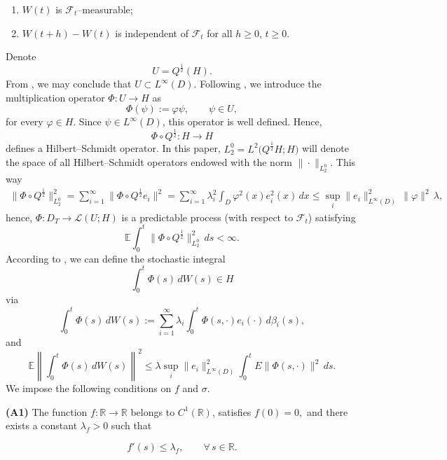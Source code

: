 \documentclass[a4paper,12pt]{article}
\numberwithin{equation}{section}
\def\E{\mathbb{E}}
\begin{document}
\begin{enumerate}
\item[(i)]
$W(t)$ is $\mathcal{F}_t$--measurable;

\item[(ii)]
$W(t+h)-W(t)$ is independent of $\mathcal{F}_t$ for all
$h\ge 0$, $t\ge 0$.
\end{enumerate}
Denote
\[
U=Q^{\frac12}(H).
\]
From \cite[Lemma 2.2]{18}, we may conclude that 
$U\subset L^\infty(D)$. Following \cite{18}, we introduce the multiplication
operator
$\Phi:U\to H$ as
\[
\Phi(\psi):=\varphi\psi,
\qquad
\psi\in U,
\]
for every $\varphi\in H$. Since $\psi\in L^\infty(D)$, this operator is
well defined. Hence,
\[
\Phi\circ Q^{\frac12}:H\to H
\]
defines a Hilbert--Schmidt operator. In this paper, $L_2^0 = L^2\!\bigl(Q^{\frac12}H;H\bigr)$
will denote the space of all Hilbert--Schmidt operators endowed with
the norm $\|\cdot\|_{L_2^0}$.
This way
\begin{equation}
\label{2.1}
\begin{aligned}
\|\Phi\circ Q^{\frac12}\|_{L_2^0}^{2}
=
\sum_{i=1}^{\infty}
\bigl\|
\Phi\circ Q^{\frac12}e_i
\bigr\|^{2} =
\sum_{i=1}^{\infty}
\lambda_i^{2}
\int_D
\varphi^{2}(x)e_i^{2}(x)\,dx
\le
\sup_i
\|e_i\|_{L^\infty(D)}^{2}
\,
\|\varphi\|^{2}
\,
\lambda,
\end{aligned}
\end{equation}
hence, $
\Phi:D_T\to\mathcal{L}(U;H)
$ is a predictable process (with respect to $\mathcal{F}_t$)
satisfying
\[
\E\int_0^t
\|\Phi\circ Q^{\frac12}\|_{L_2^0}^{2}
\,ds
<
\infty .
\]
According to \cite{19}, we can define the stochastic integral
\[
\int_0^t \Phi(s)\,dW(s)\in H
\]
via
\[
\int_0^t \Phi(s)\,dW(s):=
\sum_{i=1}^{\infty}
\lambda_i
\int_0^t
\Phi(s, \cdot)e_i(\cdot)\,
d\beta_i(s),
\]
and
\begin{equation}
\label{2.2}
\E\left\|
\int_0^t
\Phi(s)\,dW(s)
\right\|^{2}
\le
\lambda
\sup_i
\|e_i\|_{L^\infty(D)}^{2}
\int_0^t
E\|\Phi(s,\cdot)\|^{2}\,ds .
\end{equation}
We impose the following conditions on $f$ and $\sigma$.

\medskip

\noindent
{\bf (A1)} The function
$f:\mathbb{R}\to\mathbb{R}
$ belongs to $C^1(\mathbb{R})$, satisfies
$f(0)=0,$
and there exists a constant $\lambda_f>0$ such that

\begin{equation}
f'(s)\le \lambda_f,
\qquad
\forall\, s\in\mathbb{R}.
\label{2.3}
\end{equation}
\end{document}

